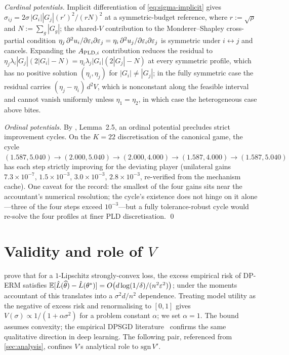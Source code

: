 \emph{Cardinal potentials.} Implicit differentiation of
\eqref{eq:sigma-implicit} gives $\sigma_{ij} =
2\sigma\,|G_i||G_j|(r')^2/(rN)^2$ at a symmetric-budget reference,
where $r := \sqrt{\rho}$ and $N := \sum_g|G_g|$; the shared-$V$
contribution to the Monderer--Shapley cross-partial condition
$\eta_j\, \partial^2 u_i / \partial\varepsilon_i\partial\varepsilon_j = \eta_i\,
\partial^2 u_j / \partial\varepsilon_i\partial\varepsilon_j$ is symmetric under
$i\leftrightarrow j$ and cancels. Expanding the $A_{\mathrm{PLD},i}$ contribution
reduces the residual to $\eta_j \lambda_i |G_j|(2|G_i| - N) = \eta_i \lambda_j
|G_i|(2|G_j| - N)$ at every symmetric profile, which has no positive
solution $(\eta_i,\eta_j)$ for $|G_i| \neq |G_j|$; in the fully
symmetric case the residual carries $(\eta_j - \eta_i)\,d^2 V$, which
is nonconstant along the feasible interval and cannot vanish
uniformly unless $\eta_1 = \eta_2$, in which case the heterogeneous
case above bites.

\emph{Ordinal potentials.} By \cite{monderer1996potential},
Lemma~2.5, an ordinal potential precludes strict improvement cycles.
On the $K=22$ discretisation of the canonical game, the cycle
$(1.587,5.040) \to (2.000,5.040) \to (2.000,4.000) \to (1.587,4.000)
\to (1.587,5.040)$ has each step strictly improving for the deviating
player (unilateral gains $7.3\times 10^{-7}$, $1.5\times 10^{-3}$,
$3.0\times 10^{-3}$, $2.8\times 10^{-3}$, re-verified from the
mechanism cache). One caveat for the record: the smallest of the four
gains sits near the accountant's numerical resolution; the cycle's
existence does not hinge on it alone---three of the four steps exceed
$10^{-3}$---but a fully tolerance-robust cycle would re-solve the
four profiles at finer \ac{PLD} discretisation. \qed

\section{Validity and role of \texorpdfstring{$V$}{V}}
\label{app:V}

\citet{bassily2014private} prove that for a $1$-Lipschitz
strongly-convex loss, the excess empirical risk of DP-ERM satisfies
$\mathbb{E}[\hat L(\widehat\theta) - \hat L(\theta^*)] =
O\!\left(d\log(1/\delta)/(n^2\varepsilon^2)\right)$; under the moments
accountant of \citet{abadi2016deep} this translates into a $\sigma^2
d/n^2$ dependence. Treating model utility as the negative of excess
risk and renormalising to $[0,1]$ gives $V(\sigma) \propto
1/(1+\alpha\sigma^2)$ for a problem constant $\alpha$; we set
$\alpha=1$. The bound assumes convexity; the empirical \ac{DPSGD}
literature~\cite{tramer2021private, abadi2016deep, boenisch2023have}
confirms the same qualitative direction in deep learning. The
following pair, referenced from \cref{sec:analysis}, confines $V$'s
analytical role to $\mathrm{sgn}\,V'$.

